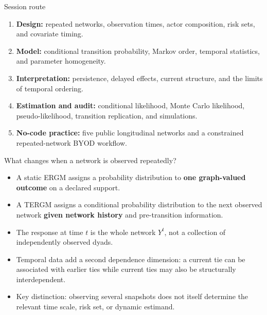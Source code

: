 \documentclass[aspectratio=169,11pt]{beamer}
\newcommand{\term}[1]{\textbf{\color{nupurple}#1}}
\begin{document}
\begin{frame}{Session route}
\begin{enumerate}
\item \term{Design:} repeated networks, observation times, actor composition, risk sets, and covariate timing.
\item \term{Model:} conditional transition probability, Markov order, temporal statistics, and parameter homogeneity.
\item \term{Interpretation:} persistence, delayed effects, current structure, and the limits of temporal ordering.
\item \term{Estimation and audit:} conditional likelihood, Monte Carlo likelihood, pseudo-likelihood, transition replication, and simulations.
\item \term{No-code practice:} five public longitudinal networks and a constrained repeated-network BYOD workflow.
\end{enumerate}
\end{frame}

\begin{frame}{What changes when a network is observed repeatedly?}
\begin{itemize}
\item A static ERGM assigns a probability distribution to \term{one graph-valued outcome} on a declared support.
\item A TERGM assigns a conditional probability distribution to the next observed network \term{given network history} and pre-transition information.
\item The response at time $t$ is the whole network $Y^t$, not a collection of independently observed dyads.
\item Temporal data add a second dependence dimension: a current tie can be associated with earlier ties while current ties may also be structurally interdependent.
\item \alert{Key distinction:} observing several snapshots does not itself determine the relevant time scale, risk set, or dynamic estimand.
\end{itemize}
\end{frame}
\end{document}
